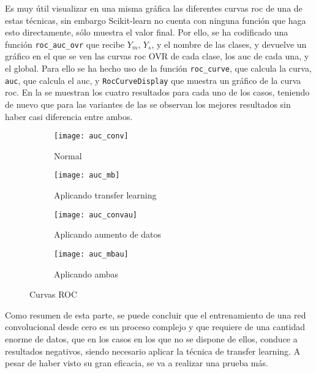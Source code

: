 				Es muy útil visualizar en una misma gráfica las diferentes curvas \gls{roc} de una de estas técnicas, sin embargo Scikit-learn no cuenta con ninguna función que haga esto directamente, sólo muestra el valor final. Por ello, se ha codificado una función \texttt{roc\_auc\_ovr} que recibe $Y_m$, $Y_s$, y el nombre de las clases, y devuelve un gráfico en el que se ven las curvas \gls{roc} OVR de cada clase, los \gls{auc} de cada una, y el global. Para ello se ha hecho uso de la función \texttt{roc\_curve}, que calcula la curva, \texttt{auc}, que calcula el \gls{auc}, y \texttt{RocCurveDisplay} que muestra un gráfico de la curva \gls{roc}. En la  se muestran los cuatro resultados para cada uno de los casos, teniendo de nuevo que para las variantes de las  se observan los mejores resultados sin haber casi diferencia entre ambos. \\
				
				\begin{figure}[!h]
					\centering
					\begin{subfigure}{.4\textwidth}
						\centering
						\texttt{[image: auc\_conv]}
						\caption{Normal}
						\label{fig:roc_conv}
					\end{subfigure}\hfill
					\begin{subfigure}{.4\textwidth}
						\centering
						\texttt{[image: auc\_mb]}
						\caption{Aplicando transfer learning}
						\label{fig:roc_mb}
					\end{subfigure}
					\begin{subfigure}{.4\textwidth}
						\centering
						\texttt{[image: auc\_convau]}
						\caption{Aplicando aumento de datos}
						\label{fig:roc_convau}
					\end{subfigure}\hfill
					\begin{subfigure}{.4\textwidth}
						\centering
						\texttt{[image: auc\_mbau]}
						\caption{Aplicando ambas}
						\label{fig:roc_mbau}
					\end{subfigure}
					\caption{Curvas ROC}
					\label{fig:roc}
				\end{figure}
			
				Como resumen de esta parte, se puede concluir que el entrenamiento de una red convolucional desde cero es un proceso complejo y que requiere de una cantidad enorme de datos, que en los casos en los que no se dispone de ellos, conduce a resultados negativos, siendo necesario aplicar la técnica de transfer learning. A pesar de haber visto su gran eficacia, se va a realizar una prueba más. \\
				
